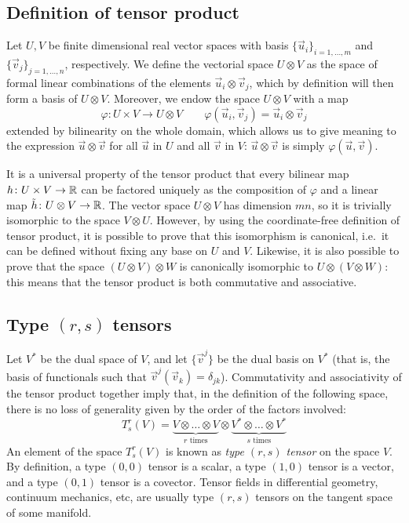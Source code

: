 \subsection*{Definition of tensor product}

Let $U,V$ be finite dimensional real vector spaces with basis
$\{\vec{u}_i\}_{i = 1,\dots,m}$ and $\{\vec{v}_j\}_{j = 1,\dots,n}$, respectively.
We define the vectorial space $U \otimes V$ as the space of formal
linear combinations of the elements $\vec{u}_i \otimes \vec{v}_j$,
which by definition will then form a basis of $U \otimes V$.
Moreover, we endow the space $U \otimes V$ with a map
\[
\varphi \colon U \times V \to U \otimes V
\qquad
\varphi(\vec{u}_i,\vec{v}_j) = \vec{u}_i \otimes \vec{v}_j
\]
extended by bilinearity on the whole domain,
which allows us to give meaning to the expression $\vec{u} \otimes \vec{v}$
for all $\vec{u}$ in $U$ and all $\vec{v}$ in $V$: $\vec{u} \otimes \vec{v}$
is simply $\varphi(\vec{u},\vec{v})$.

It is a universal property of the tensor product that every bilinear map
$h \colon U \times V \to \mathbb{R}$ can be factored uniquely as the composition of
$\varphi$ and a linear map $\tilde{h} \colon U \otimes V \to \mathbb{R}$.
The vector space $U \otimes V$ has dimension $mn$, so it is trivially isomorphic
to the space $V \otimes U$. However, by using the coordinate-free definition
of tensor product, it is possible to prove that this isomorphism is canonical,
i.e.\ it can be defined without fixing any base on $U$ and $V$.
Likewise, it is also possible to prove that the space $(U \otimes V) \otimes W$
is canonically isomorphic to $U \otimes (V \otimes W)$: this means that the tensor
product is both commutative and associative.

\subsection*{Type $(r,s)$ tensors}

Let $V^*$ be the dual space of $V$, and let $\{\vec{v}^j\}$ be the dual basis
on $V^*$ (that is, the basis of functionals such that
$\vec{v}^j(\vec{v}_k) = \delta_{jk}$).
Commutativity and associativity of the tensor product together imply that,
in the definition of the following space, there is no loss of generality
given by the order of the factors involved:
\[
T^r_s(V) = \underbrace{V \otimes \dots \otimes V}_{\text{$r$ times}}
\otimes
\underbrace{V^* \otimes \dots \otimes V^*}_{\text{$s$ times}}
\]
An element of the space $T_s^r(V)$ is known as \emph{type $(r,s)$ tensor}
on the space $V$. By definition, a type $(0,0)$ tensor is a scalar,
a type $(1,0)$ tensor is a vector, and a type $(0,1)$ tensor is a covector.
Tensor fields in differential geometry, continuum mechanics,
etc, are usually type $(r,s)$ tensors on the tangent space of some manifold.

